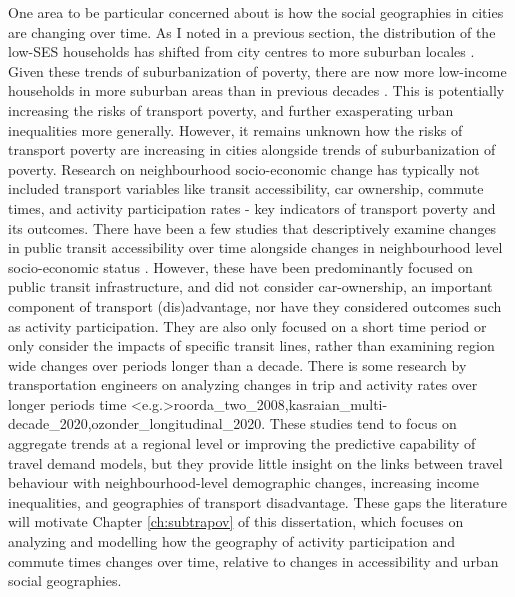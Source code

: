One area to be particular concerned about is how the social geographies in cities are changing over time. As I noted in a previous section, the distribution of the low-SES households has shifted from city centres to more suburban locales \cite{ehrenhalt_great_2012,ades_are_2012}. Given these trends of suburbanization of poverty, there are now more low-income households in more suburban areas than in previous decades \cite{ades_are_2012,ades_is_2016,breau_pulling_2018}. This is potentially increasing the risks of transport poverty, and further exasperating urban inequalities more generally. However, it remains unknown how the risks of transport poverty are increasing in cities alongside trends of suburbanization of poverty. Research on neighbourhood socio-economic change has typically not included transport variables like transit accessibility, car ownership, commute times, and activity participation rates - key indicators of transport poverty and its outcomes. There have been a few studies that descriptively examine changes in public transit accessibility over time alongside changes in neighbourhood level socio-economic status . However, these have been predominantly focused on public transit infrastructure, and did not consider car-ownership, an important component of transport (dis)advantage, nor have they considered outcomes such as activity participation. They are also only focused on a short time period or only consider the impacts of specific transit lines, rather than examining region wide changes over periods longer than a decade. There is some research by transportation engineers on analyzing changes in trip and activity rates over longer periods time \shortcite<e.g.>{roorda_two_2008,kasraian_multi-decade_2020,ozonder_longitudinal_2020}. These studies tend to focus on aggregate trends at a regional level or improving the predictive capability of travel demand models, but they provide little insight on the links between travel behaviour with neighbourhood-level demographic changes, increasing income inequalities, and geographies of transport disadvantage. These gaps the literature will motivate Chapter \ref{ch:subtrapov} of this dissertation, which focuses on analyzing and modelling how the geography of activity participation and commute times changes over time, relative to changes in accessibility and urban social geographies.